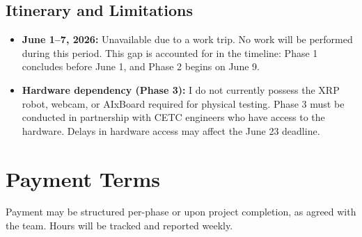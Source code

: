 \documentclass[a4paper]{article}
\begin{document}
\subsection*{Itinerary and Limitations}

\begin{itemize}
    \item \textbf{June 1--7, 2026:} Unavailable due to a work trip. No work will be performed during this period. This gap is accounted for in the timeline: Phase 1 concludes before June 1, and Phase 2 begins on June 9.
    \item \textbf{Hardware dependency (Phase 3):} I do not currently possess the XRP robot, webcam, or AIxBoard required for physical testing. Phase 3 must be conducted in partnership with CETC engineers who have access to the hardware. Delays in hardware access may affect the June 23 deadline.
\end{itemize}

\section*{Payment Terms}

Payment may be structured per-phase or upon project completion, as agreed with the team. Hours will be tracked and reported weekly.
\end{document}
